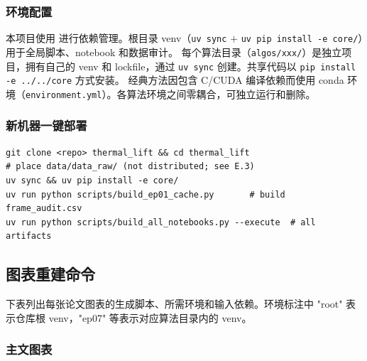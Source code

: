 \subsubsection{环境配置}

本项目使用  进行依赖管理。根目录 venv（\texttt{uv sync} \(+\) \texttt{uv pip install -e core/}）用于全局脚本、notebook 和数据审计。
每个算法目录（\texttt{algos/xxx/}）是独立项目，拥有自己的 venv 和 lockfile，通过 \texttt{uv sync} 创建。共享代码以 \texttt{pip install -e ../../core} 方式安装。
 经典方法因包含 C/CUDA 编译依赖而使用 conda 环境（\texttt{environment.yml}）。各算法环境之间零耦合，可独立运行和删除。

\subsubsection{新机器一键部署}

\begin{verbatim}
git clone <repo> thermal_lift && cd thermal_lift
# place data/data_raw/ (not distributed; see E.3)
uv sync && uv pip install -e core/
uv run python scripts/build_ep01_cache.py       # build frame_audit.csv
uv run python scripts/build_all_notebooks.py --execute  # all artifacts
\end{verbatim}

\subsection{图表重建命令}

下表列出每张论文图表的生成脚本、所需环境和输入依赖。环境标注中 "root" 表示仓库根 venv，"ep07" 等表示对应算法目录内的 venv。

\subsubsection{主文图表}

